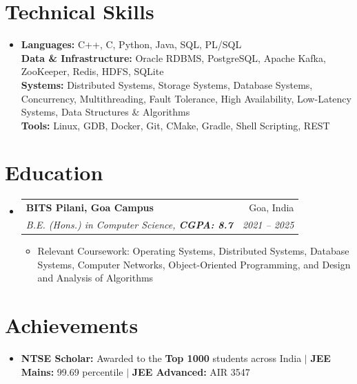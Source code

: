 \documentclass[letterpaper,10pt]{article}
\makeatletter
\newcommand{\resumeItem}[1]{\item\small{{#1\vspace{-2pt}}}}
\newcommand{\resumeSubheading}[4]{\vspace{-2pt}\item\begin{tabular*}{0.97\textwidth}[t]{l@{\extracolsep{\fill}}r}\textbf{#1} & #2 \\\textit{\footnotesize#3} & \textit{\footnotesize#4} \\\end{tabular*}\vspace{-7pt}}
\newcommand{\resumeSubHeadingListStart}{\begin{itemize}[leftmargin=0.12in,label={}]}
\newcommand{\resumeSubHeadingListEnd}{\end{itemize}}
\newcommand{\resumeItemListStart}{\begin{itemize}[leftmargin=0.18in]}
\newcommand{\resumeItemListEnd}{\end{itemize}\vspace{-8pt}}
\makeatother
\begin{document}
\section{Technical Skills}
\resumeSubHeadingListStart
\item\small{\textbf{Languages:} C++, C, Python, Java, SQL, PL/SQL \\
\textbf{Data \& Infrastructure:} Oracle RDBMS, PostgreSQL, Apache Kafka, ZooKeeper, Redis, HDFS, SQLite \\
\textbf{Systems:} Distributed Systems, Storage Systems, Database Systems, Concurrency, Multithreading, Fault Tolerance, High Availability, Low-Latency Systems, Data Structures \& Algorithms \\
\textbf{Tools:} Linux, GDB, Docker, Git, CMake, Gradle, Shell Scripting, REST}
\resumeSubHeadingListEnd
\section{Education}
\resumeSubHeadingListStart
\resumeSubheading{BITS Pilani, Goa Campus}{Goa, India}{B.E. (Hons.) in Computer Science, \textbf{CGPA: 8.7}}{2021 -- 2025}
\resumeItemListStart
\resumeItem{Relevant Coursework: Operating Systems, Distributed Systems, Database Systems, Computer Networks, Object-Oriented Programming, and Design and Analysis of Algorithms}
\resumeItemListEnd
\resumeSubHeadingListEnd
\section{Achievements}
\resumeSubHeadingListStart
\item\small{\textbf{NTSE Scholar:} Awarded to the \textbf{Top 1000} students across India \hspace{8pt} $|$ \hspace{8pt} \textbf{JEE Mains:} 99.69 percentile \hspace{8pt} $|$ \hspace{8pt} \textbf{JEE Advanced:} AIR 3547}
\resumeSubHeadingListEnd
\end{document}
